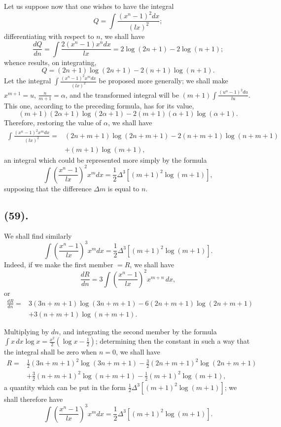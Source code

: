 \documentclass{article}
\begin{document}
Let us suppose now that one wishes to have the integral
\[ Q=\int\frac{(x^{n}-1)^{2}dx}{(lx)^{2}}; \]
differentiating with respect to $n$, we shall have
\[ \frac{dQ}{dn}=\int\frac{2(x^{n}-1)x^{n}dx}{lx}=2\log(2n+1)-2\log(n+1); \]
whence results, on integrating,
\[ Q=(2n+1)\log(2n+1)-2(n+1)\log(n+1). \tag{3} \]
Let the integral $\displaystyle\int\frac{(x^{n}-1)^{2}x^{m}dx}{(lx)^{2}}$ be proposed more generally; we shall make $x^{m+1}=u$, $\frac{n}{m+1}=\alpha$, and the transformed integral will be $\displaystyle(m+1)\int\frac{(u^{\alpha}-1)^{2}du}{lu}$. This one, according to the preceding formula, has for its value,
\[ (m+1)(2\alpha+1)\log(2\alpha+1)-2(m+1)(\alpha+1)\log(\alpha+1). \]
Therefore, restoring the value of $\alpha$, we shall have
\[ \begin{aligned} \int\frac{(x^{n}-1)^{2}x^{m}dx}{(lx)^{2}}={}&(2n+m+1)\log(2n+m+1)-2(n+m+1)\log(n+m+1)\\ &+(m+1)\log(m+1), \end{aligned} \]
an integral which could be represented more simply by the formula
\[ \int\left(\frac{x^{n}-1}{lx}\right)^{2}x^{m}dx=\frac{1}{2}\Delta^{3}[(m+1)^{2}\log(m+1)], \tag{4} \]
supposing that the difference $\Delta m$ is equal to $n$.

\subsection*{(59).}

We shall find similarly
\[ \int\left(\frac{x^{n}-1}{lx}\right)^{3}x^{m}dx=\frac{1}{2}\Delta^{3}[(m+1)^{2}\log(m+1)]. \]
Indeed, if we make the first member $=R$, we shall have
\[ \frac{dR}{dn}=3\int\left(\frac{x^{n}-1}{lx}\right)^{2}x^{m+n}\,dx, \]
or
\[ \begin{aligned} \frac{dR}{dn}={}&3(3n+m+1)\log(3n+m+1)-6(2n+m+1)\log(2n+m+1)\\ &+3(n+m+1)\log(n+m+1). \end{aligned} \]

Multiplying by $dn$, and integrating the second member by the formula $\displaystyle\int x\,dx\log x=\frac{x^{2}}{2}(\log x-\tfrac{1}{2})$; determining then the constant in such a way that the integral shall be zero when $n=0$, we shall have
\[ \begin{aligned} R={}&\tfrac{1}{2}(3n+m+1)^{2}\log(3n+m+1)-\tfrac{3}{2}(2n+m+1)^{2}\log(2n+m+1)\\ &+\tfrac{3}{2}(n+m+1)^{2}\log(n+m+1)-\tfrac{1}{2}(m+1)^{2}\log(m+1), \end{aligned} \]
a quantity which can be put in the form $\frac{1}{2}\Delta^{3}[(m+1)^{2}\log(m+1)]$; we shall therefore have
\[ \int\left(\frac{x^{n}-1}{lx}\right)^{3}x^{m}dx=\frac{1}{2}\Delta^{3}[(m+1)^{2}\log(m+1)]. \tag{5} \]
\end{document}

